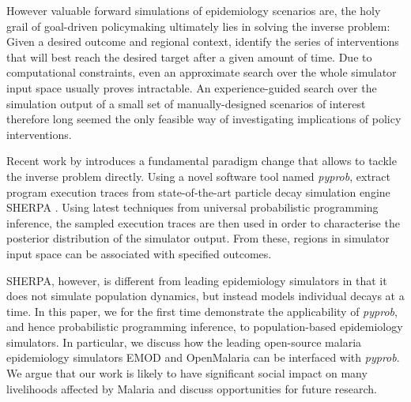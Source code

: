 \documentclass{article}
\begin{document}
However valuable forward simulations of epidemiology scenarios are, the holy grail of goal-driven policymaking ultimately lies in solving the inverse problem: Given a desired outcome and regional context, identify the series of interventions that will best reach the desired target after a given amount of time. Due to computational constraints, even an approximate search over the whole simulator input space usually proves intractable. An experience-guided search over the simulation output of a small set of manually-designed scenarios of interest therefore long seemed the only feasible way of investigating implications of policy interventions.

Recent work by \citep{gunes_baydin_efficient_2018} introduces a fundamental paradigm change that allows to tackle the inverse problem directly. Using a novel software tool named \textit{pyprob}, \citep{gunes_baydin_efficient_2018} extract program execution traces from state-of-the-art particle decay simulation engine SHERPA \cite{gleisberg_event_2008}. Using latest techniques from universal probabilistic programming inference, the sampled execution traces are then used in order to characterise the posterior distribution of the simulator output. From these, regions in simulator input space can be associated with specified outcomes.

SHERPA, however, is different from leading epidemiology simulators in that it does not simulate population dynamics, but instead models individual decays at a time. In this paper, we for the first time demonstrate the applicability of \textit{pyprob}, and hence probabilistic programming inference, to population-based epidemiology simulators. In particular, we discuss how the leading open-source malaria epidemiology simulators EMOD \cite{bershteyn_implementation_2018} and OpenMalaria \cite{smith_towards_2008}\cite{chitnis_periodically-forced_2012} can be interfaced with \textit{pyprob}. We argue that our work is likely to have significant social impact on many livelihoods affected by Malaria and discuss opportunities for future research.



\end{document}
